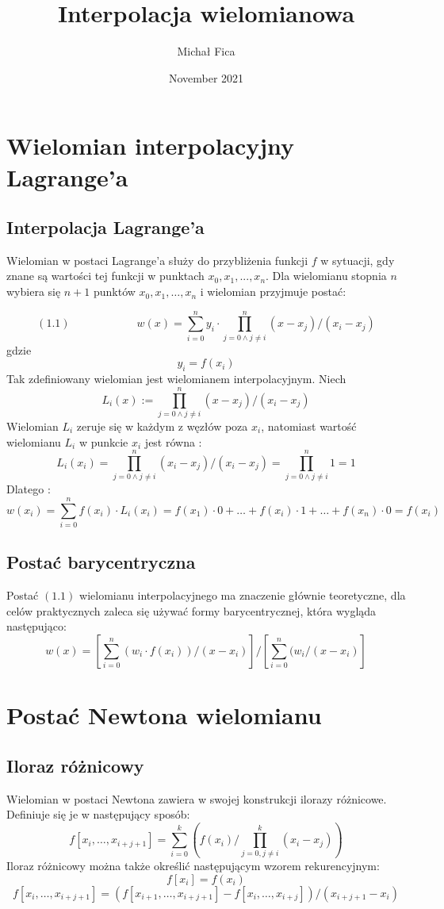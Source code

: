\documentclass{article}
\title{Interpolacja wielomianowa}
\author{Michał Fica}
\date{November 2021}
\begin{document}
\maketitle

\section{Wielomian interpolacyjny Lagrange'a}

\subsection{Interpolacja Lagrange'a}
Wielomian w postaci Lagrange'a służy do przybliżenia funkcji $f$ w sytuacji, gdy znane są wartości tej funkcji w punktach $ x_{0}, x_{1},  ..., x_{n}$. Dla wielomianu stopnia $n$ wybiera się $n+1$ punktów $ x_{0}, x_{1},  \ldots, x_{n}$ i wielomian przyjmuje postać: 

$$ (1.1) \qquad \qquad \qquad w(x) = \sum_{i=0}^n y_{i} \cdot\prod_{j=0 \wedge j \neq i}^{n}(x-x_{j})/(x_{i}-x_{j})$$
gdzie $$y_{i} = f(x_{i}) $$Tak zdefiniowany wielomian jest wielomianem interpolacyjnym. Niech $$ L_{i}(x) := \prod_{j=0 \wedge j\neq i}^{n}(x-x_{j})/(x_{i}-x_{j})$$Wielomian $L_{i}$ zeruje się w każdym z węzłów poza $x_{i}$, natomiast wartość wielomianu $L_{i}$ w punkcie $x_{i}$ jest równa : 
$$ L_{i}(x_{i}) = \prod_{j=0 \wedge j\neq i}^{n}(x_{i}-x_{j})/(x_{i}-x_{j}) = \prod_{j=0 \wedge j\neq i}^{n}1 = 1$$Dlatego : 
$$w(x_{i}) =  \sum_{i=0}^n f(x_{i}) \cdot L_{i}(x_{i}) = f(x_{1})\cdot0 + \ldots + f(x_{i})\cdot1 + \ldots + f(x_{n})\cdot0 = f(x_{i})$$

\subsection{Postać barycentryczna}
Postać $(1.1)$ wielomianu interpolacyjnego ma znaczenie głównie teoretyczne, dla celów praktycznych zaleca się używać formy barycentrycznej, która wygląda następująco: 
$$ w(x) = [\sum_{i=0}^{n} (w_{i} \cdot f(x_{i}))/(x-x_{i}) ]/[\sum_{i=0}^{n} (w_{i}/(x-x_{i})] $$ 




\section{Postać Newtona wielomianu}

\subsection{Iloraz różnicowy}
Wielomian w postaci Newtona zawiera w swojej konstrukcji ilorazy różnicowe. Definiuje się je w następujący sposób: 
$$ f[x_{i},\ldots,x_{i+j+1}] = \sum_{i=0}^k (f(x_{i})/\prod_{j=0,j\neq i}^k(x_{i}-x_{j}))$$Iloraz różnicowy można także określić następującym wzorem rekurencyjnym: $$ f[x_{i}] = f(x_{i})$$
$$ f[x_{i},\ldots,x_{i+j+1}] = (f[x_{i+1},\ldots,x_{i+j+1}] - f[x_{i},\ldots,x_{i+j}])/(x_{i+j+1} - x_{i})$$
\end{document}
